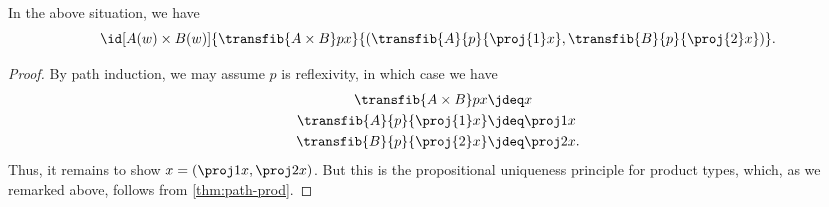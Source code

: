 %
\begin{thm}\label{thm:trans-prod}
  In the above situation, we have
  \[
  \id[A(w) \times B(w)]
  {\transfib{A\times B}px}
  {(\transfib{A}{p}{\proj{1}x}, \transfib{B}{p}{\proj{2}x})}.
  \]
\end{thm}

\begin{proof}
  By path induction, we may assume $p$ is reflexivity, in which case we have
  \begin{align*}
    \transfib{A\times B}px&\jdeq x\\
    \transfib{A}{p}{\proj{1}x}&\jdeq \proj1x\\
    \transfib{B}{p}{\proj{2}x}&\jdeq \proj2x.
  \end{align*}
  Thus, it remains to show $x = (\proj1 x, \proj2x)$.
  But this is the propositional uniqueness principle for product types, which, as we remarked above, follows from \cref{thm:path-prod}.
\end{proof}
